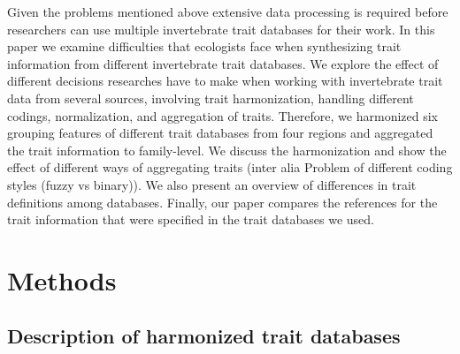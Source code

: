\documentclass{article}
\begin{document}
Given the problems mentioned above extensive data processing is required before researchers 
can use multiple invertebrate trait databases for their work. 
In this paper we examine difficulties that ecologists face when synthesizing trait 
information from different invertebrate trait databases. We explore the effect of different
decisions researches have to make when working with invertebrate trait data 
from several sources, involving trait harmonization, handling different codings,
normalization, and aggregation of traits.
Therefore, we harmonized six grouping features of different trait databases from four
regions and aggregated the trait information to family-level. %
We discuss the harmonization and show the effect of different ways of aggregating 
traits (inter alia Problem of different coding styles (fuzzy vs binary)).
We also present an overview of differences in trait definitions among databases.
Finally, our paper compares the references for the trait information that 
were specified in the trait databases we used.


\section{Methods}

\subsection{Description of harmonized trait databases} 
\end{document}
